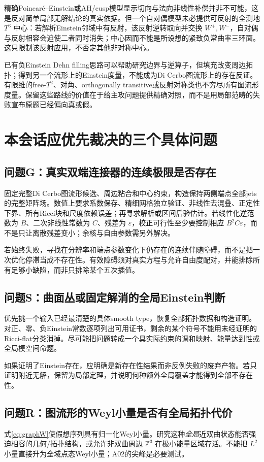 \documentclass[UTF8,a4paper,11pt,fontset=fandol]{ctexart}
\numberwithin{equation}{section}
\theoremstyle{definition}
\newcommand{\Z}{\mathbb Z}
\begin{document}
精确Poincar\'e--Einstein或AH/cusp模型显示切向与法向非线性补偿并非不可能，这是反对简单局部无解结论的真实依据。但一个自对偶模型未必提供可反射的全测地 $T^3$ 中心：若解析Einstein邻域中有反射，该反射逆转取向并交换 $W^+,W^-$，自对偶与反射相容会迫使二者同时消失；中心因而不能是所设想的紧致负常曲率三环面。这只限制该反射应用，不否定其他非对称中心。

已有负Einstein Dehn filling思路可以帮助研究边界与逆算子，但填充改变周边拓扑；得到另一个流形上的Einstein度量，不能成为Di Cerbo图流形上的存在反证。有限维的free-$T^2$、对角、orthogonally transitive或反射对称类也不穷尽所有图流形度量。保留这些路线的价值在于给主攻问题提供精确对照，而不是用局部范畴的失败宣布原题已经偏向真或假。

\section{本会话应优先裁决的三个具体问题}
\subsection{问题G：真实双端连接器的连续极限是否存在}
固定完整Di Cerbo图流形候选、周边粘合和中心约束，构造保持两侧端点全部jets的完整矩阵场。数值上要求系数保存、精细网格独立验证、非线性去混叠、正定性下界、所有Ricci块和尺度依赖误差；再寻求解析或区间后验估计。若线性化逆范数为 $B$、二次非线性常数为 $C$、残差为 $\varepsilon$，校正可行性至少要控制相应 $B^2C\varepsilon$，而不是只让离散残差变小；余核与自由参数需另外解决。

若始终失败，寻找在分辨率和端点参数变化下仍存在的连续伴随障碍，而不是把一次优化停滞当成不存在性。有效障碍须对真实方程与允许自由度配对，并能排除所有足够小缺陷，而非只排除某个五次插值。

\subsection{问题S：曲面丛或固定解消的全局Einstein判断}
优先挑一个输入已经最清楚的具体smooth type，恢复全部拓扑数据和构造证明。对正、零、负Einstein常数逐项列出可用证书，剩余的某个符号不能用未经证明的Ricci-flat分类消掉。尽可能把问题转成一个具实际约束的调和映射、能量达到性或全局模空间命题。

如果证明了Einstein存在，应明确是新存在性结果而非反例失败的废弃产物。若只证明附近无解，保留为局部定理，并说明何种额外全局覆盖才能得到全部不存在性。

\subsection{问题R：图流形的Weyl小量是否有全局拓扑代价}
式\eqref{eq:graphW}使假想序列具有归一化Weyl小量。研究这种\emph{全局}近双曲状态能否强迫相容的几何/拓扑结构，或允许非双曲周边 $\Z^3$ 在极小能量区域存活。不能把 $L^2$ 小量直接升为全域点态Weyl小量；A02的尖峰是必要测试。
\end{document}
